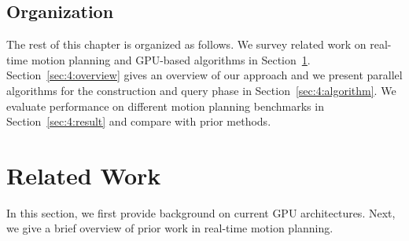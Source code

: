 \subsection{Organization}
The rest of this chapter is organized as follows. We survey
related work on real-time motion planning and GPU-based algorithms in Section~\ref{sec:4:related}. Section~\ref{sec:4:overview} gives an overview of our approach and we present parallel algorithms for
the construction and query phase in Section~\ref{sec:4:algorithm}. We evaluate performance
on different motion planning benchmarks in Section~\ref{sec:4:result} and compare with prior
methods.

\section{Related Work}
\label{sec:4:related}
In this section, we first provide background on current GPU architectures. Next, we give a brief overview of prior work in real-time motion planning.

